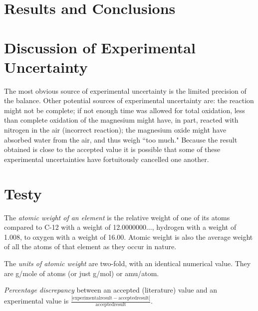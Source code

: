 \documentclass[11pt,a4paper,polish]{article}
\begin{document}
\section{Results and Conclusions}



\section{Discussion of Experimental Uncertainty}


The most obvious source of experimental uncertainty is the limited precision of the balance. Other potential sources of experimental uncertainty are: the reaction might not be complete; if not enough time was allowed for total oxidation, less than complete oxidation of the magnesium might have, in part, reacted with nitrogen in the air (incorrect reaction); the magnesium oxide might have absorbed water from the air, and thus weigh ``too much." Because the result obtained is close to the accepted value it is possible that some of these experimental uncertainties have fortuitously cancelled one another.


\section{Testy}

\begin{enumerate}
\begin{item}
The \emph{atomic weight of an element} is the relative weight of one of its atoms compared to C-12 with a weight of 12.0000000$\ldots$, hydrogen with a weight of 1.008, to oxygen with a weight of 16.00. Atomic weight is also the average weight of all the atoms of that element as they occur in nature.
\end{item}
\begin{item}
The \emph{units of atomic weight} are two-fold, with an identical numerical value. They are g/mole of atoms (or just g/mol) or amu/atom.
\end{item}
\begin{item}
\emph{Percentage discrepancy} between an accepted (literature) value and an experimental value is $\frac{|\mathrm{experimental result} - \mathrm{accepted result}|}{\mathrm{accepted result}}$.
\end{item}
\end{enumerate}






\end{document}
